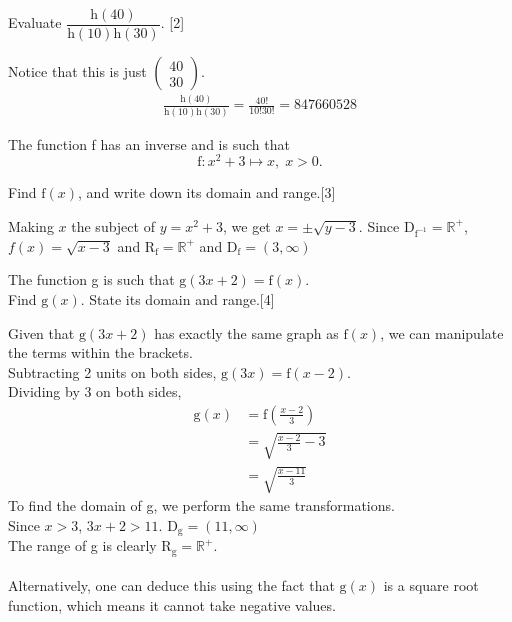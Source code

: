 \documentclass[12pt, a4 paper]{article}
\begin{document}
\begin{outline}[enumerate]
 \2 Evaluate $\dfrac{\textrm{h}(40)}{\textrm{h}(10)\textrm{h}(30)}$. \hfill[2]
 \begin{answer}
  Notice that this is just $\left(\begin{smallmatrix}40\\30\end{smallmatrix}\right)$.
  \begin{align*}
   \frac{\textrm{h}(40)}{\textrm{h}(10)\textrm{h}(30)} = \frac{40!}{10!30!} = 847660528
  \end{align*}
 \end{answer}

 \1 The function f has an inverse and is such that \[\textrm{f}:x^2+3 \mapsto x,\;x>0.\]

 \2 Find $\textrm{f}(x)$, and write down its domain and range.\hfill[3]
 \begin{answer}
  Making $x$ the subject of $y=x^2+3$, we get $x=\pm\sqrt{y-3}$. Since D$_{\textrm{f}^{-1}} = \mathbb{R}^+$, $f(x) = \sqrt{x-3}$ and R$_\textrm{f}=\mathbb{R}^+$ and D$_\textrm{f}=(3,\infty)$
 \end{answer}

 \2 The function g is such that $\textrm{g}(3x+2)=\textrm{f}(x)$.\\ Find $\textrm{g}(x)$. State its domain and range.\hfill[4]
 \begin{answer}
  Given that $\textrm{g}(3x+2)$ has exactly the same graph as $\textrm{f}(x)$, we can manipulate the terms within the brackets.\\
  Subtracting 2 units on  both sides, $\textrm{g}(3x)=\textrm{f}(x-2)$.\\
  Dividing by 3 on both sides,
  \begin{align*}
   \textrm{g}(x) & =\textrm{f}\left(\frac{x-2}{3}\right) \\
                 & = \sqrt{\frac{x-2}{3}-3}              \\
                 & = \sqrt{\frac{x-11}{3}}
  \end{align*}
  To find the domain of g, we perform the same transformations.\\
  Since $x>3$, $3x+2>11$. D$_{\textrm{g}}=(11,\infty)$\\
  The range of g is clearly R$_\textrm{g}=\mathbb{R}^+$.\\\\
  Alternatively, one can deduce this using the fact that $\textrm{g}(x)$ is a square root function, which means it cannot take negative values.
 \end{answer}

\end{outline}
\end{document}

